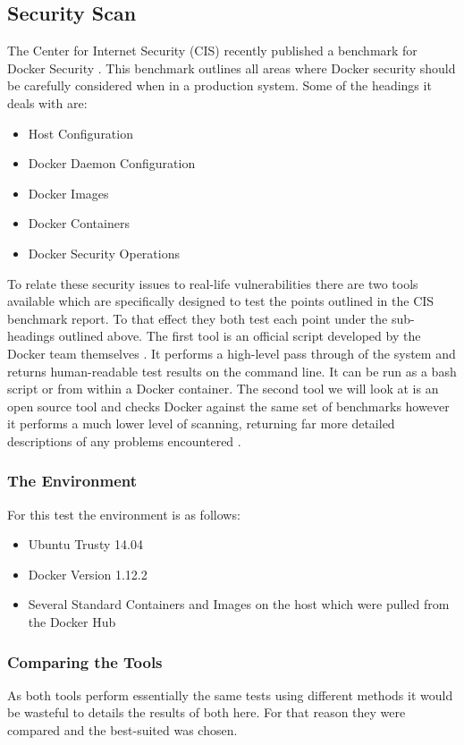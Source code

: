 \documentclass{article}
\begin{document}
\subsection{Security Scan}
\label{sub:scan}
The Center for Internet Security (CIS) recently published a benchmark for Docker Security \citep{CenterofInternetSecurity2016}. This benchmark outlines all areas where Docker security should be carefully considered when in a production system. Some of the headings it deals with are:

\begin{itemize}
  \item Host Configuration
  \item Docker Daemon Configuration
  \item Docker Images 
  \item Docker Containers
  \item Docker Security Operations
\end{itemize}

To relate these security issues to real-life vulnerabilities there are two tools available which are specifically designed to test the points outlined in the CIS benchmark report. To that effect they both test each point under the sub-headings outlined above. The first tool is an official script developed by the Docker team themselves \citep{DockerRepo2016}. It performs a high-level pass through of the system and returns human-readable test results on the command line. It can be run as a bash script or from within a Docker container. The second tool we will look at is an open source tool and checks Docker against the same set of benchmarks however it performs a much lower level of scanning, returning far more detailed descriptions of any problems encountered \citep{Ledenev2016}.

\subsubsection{The Environment}
For this test the environment is as follows:

\begin{itemize}
  \item Ubuntu Trusty 14.04
  \item Docker Version 1.12.2
  \item Several Standard Containers and Images on the host which were pulled from the Docker Hub
\end{itemize}

\subsubsection{Comparing the Tools}
As both tools perform essentially the same tests using different methods it would be wasteful to details the results of both here. For that reason they were compared and the best-suited was chosen.
\end{document}
